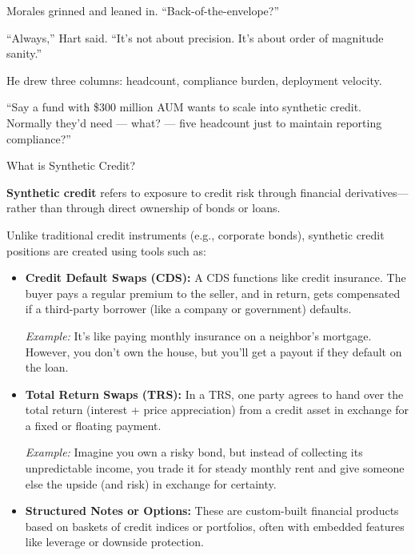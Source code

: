 Morales grinned and leaned in. ``Back-of-the-envelope?''

``Always,'' Hart said. ``It’s not about precision. It’s about order of magnitude sanity.''

He drew three columns: headcount, compliance burden, deployment velocity.

``Say a fund with \$300 million AUM wants to scale into synthetic credit. Normally they’d need --- what? --- five 
headcount just to maintain reporting compliance?''

\medskip

\begin{TechnicalSidebar}{What is Synthetic Credit?}

  \textbf{Synthetic credit} refers to exposure to credit risk through financial derivatives—rather than through direct 
  ownership of bonds or loans.

  \medskip
  
  Unlike traditional credit instruments (e.g., corporate bonds), synthetic credit positions are created using tools 
  such as:

  \medskip
  
  \begin{itemize}
    \item \textbf{Credit Default Swaps (CDS):}  
    A CDS functions like credit insurance. The buyer pays a regular premium to the seller, and in return, gets 
    compensated if a third-party borrower (like a company or government) defaults.  

    \medskip
  
    \textit{Example:} It's like paying monthly insurance on a neighbor’s mortgage. However, you don’t own the house, but 
    you’ll get a payout if they default on the loan.


    \medskip
  
    \item \textbf{Total Return Swaps (TRS):}  
    In a TRS, one party agrees to hand over the total return (interest + price appreciation) from a credit asset 
    in exchange for a fixed or floating payment.  

    \medskip
  

    \textit{Example:} Imagine you own a risky bond, but instead of collecting its unpredictable income, you trade 
    it for steady monthly rent and give someone else the upside (and risk) in exchange for certainty.


    \medskip
  
    \item \textbf{Structured Notes or Options:}  
    These are custom-built financial products based on baskets of credit indices or portfolios, often with embedded 
    features like leverage or downside protection.  


\end{itemize}
\end{TechnicalSidebar}
